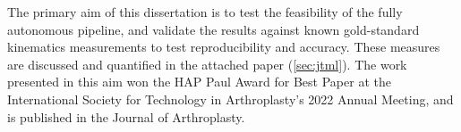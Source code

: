 The primary aim of this dissertation is to test the feasibility of the fully autonomous pipeline, and validate the results against known gold-standard kinematics measurements to test reproducibility and accuracy.
These measures are discussed and quantified in the attached paper (\cref{sec:jtml}).
The work presented in this aim won the HAP Paul Award for Best Paper at the International Society for Technology in Arthroplasty's 2022 Annual Meeting, and is published in the Journal of Arthroplasty.

